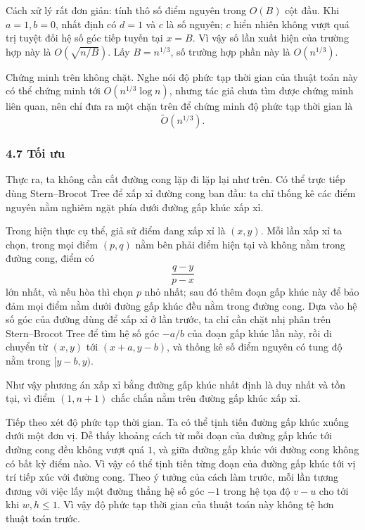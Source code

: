 \documentclass[11pt]{article}
\begin{document}
Cách xử lý rất đơn giản: tính thô số điểm nguyên trong \(O(B)\) cột đầu. Khi
\(a=1,b=0\), nhất định có \(d=1\) và \(c\) là số nguyên; \(c\) hiển nhiên không
vượt quá trị tuyệt đối hệ số góc tiếp tuyến tại \(x=B\). Vì vậy số lần xuất
hiện của trường hợp này là \(O(\sqrt{n/B})\). Lấy \(B=n^{1/3}\), số trường hợp
phần này là \(O(n^{1/3})\).

Chứng minh trên không chặt. Nghe nói độ phức tạp thời gian của thuật toán này
có thể chứng minh tới \(O(n^{1/3}\log n)\), nhưng tác giả chưa tìm được chứng
minh liên quan, nên chỉ đưa ra một chặn trên để chứng minh độ phức tạp thời
gian là
\[
  \widetilde O(n^{1/3}).
\]

\subsubsection*{4.7 Tối ưu}

Thực ra, ta không cần cắt đường cong lặp đi lặp lại như trên. Có thể trực tiếp
dùng Stern--Brocot Tree để xấp xỉ đường cong ban đầu: ta chỉ thống kê các điểm
nguyên nằm nghiêm ngặt phía dưới đường gấp khúc xấp xỉ.

\begin{center}
\end{center}

Trong hiện thực cụ thể, giả sử điểm đang xấp xỉ là \((x,y)\). Mỗi lần xấp xỉ
ta chọn, trong mọi điểm \((p,q)\) nằm bên phải điểm hiện tại và không nằm trong
đường cong, điểm có
\[
  \frac{q-y}{p-x}
\]
lớn nhất, và nếu hòa thì chọn \(p\) nhỏ nhất; sau đó thêm đoạn gấp khúc này để
bảo đảm mọi điểm nằm dưới đường gấp khúc đều nằm trong đường cong. Dựa vào hệ
số góc của đường dùng để xấp xỉ ở lần trước, ta chỉ cần chặt nhị phân trên
Stern--Brocot Tree để tìm hệ số góc \(-a/b\) của đoạn gấp khúc lần này, rồi di
chuyển từ \((x,y)\) tới \((x+a,y-b)\), và thống kê số điểm nguyên có tung độ
nằm trong \([y-b,y)\).

Như vậy phương án xấp xỉ bằng đường gấp khúc nhất định là duy nhất và tồn tại,
vì điểm \((1,n+1)\) chắc chắn nằm trên đường gấp khúc xấp xỉ.

Tiếp theo xét độ phức tạp thời gian. Ta có thể tịnh tiến đường gấp khúc xuống
dưới một đơn vị. Dễ thấy khoảng cách từ mỗi đoạn của đường gấp khúc tới đường
cong đều không vượt quá \(1\), và giữa đường gấp khúc với đường cong không có
bất kỳ điểm nào. Vì vậy có thể tịnh tiến từng đoạn của đường gấp khúc tới vị
trí tiếp xúc với đường cong. Theo ý tưởng của cách làm trước, mỗi lần tương
đương với việc lấy một đường thẳng hệ số góc \(-1\) trong hệ tọa độ \(v-u\) cho
tới khi \(w,h\le 1\). Vì vậy độ phức tạp thời gian của thuật toán này không tệ
hơn thuật toán trước.
\end{document}
